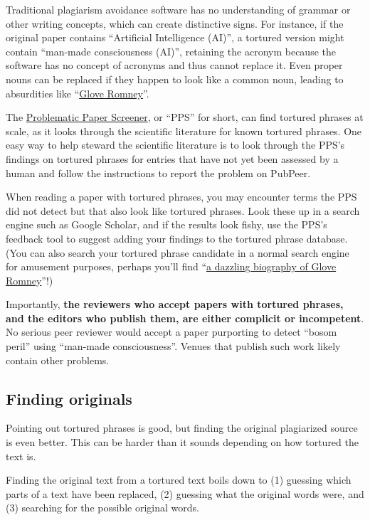 \documentclass[letterpaper, 12pt]{article}
\begin{document}
Traditional plagiarism avoidance software has no understanding of grammar or other writing concepts,
which can create distinctive signs.
For instance, if the original paper contains ``Artificial Intelligence (AI)'',
a tortured version might contain ``man-made consciousness (AI)'',
retaining the acronym because the software has no concept of acronyms and thus cannot replace it.
Even proper nouns can be replaced if they happen to look like a common noun,
leading to absurdities like ``\href{https://pubpeer.com/publications/059D502827972226591FC5F5421221}{Glove Romney}''.

The \href{https://www.irit.fr/~Guillaume.Cabanac/problematic-paper-screener}{Problematic Paper Screener},
or ``PPS'' for short, can find tortured phrases at scale, as it looks through the scientific literature for known tortured phrases.
One easy way to help steward the scientific literature is to look through the PPS's findings on tortured phrases for entries that have not yet been assessed by a human and follow the instructions to report the problem on PubPeer.

When reading a paper with tortured phrases, you may encounter terms the PPS did not detect but that also look like tortured phrases.
Look these up in a search engine such as Google Scholar, and if the results look fishy, use the PPS's feedback tool to suggest adding your findings to the tortured phrase database.
(You can also search your tortured phrase candidate in a normal search engine for amusement purposes, perhaps you'll find ``\href{https://web.archive.org/web/20250322132615/https://www.amazon.com/Mitt-Romney-Biography-Book-Flexibility-ebook/dp/B0CLKZKKQG}{a dazzling biography of Glove Romney}''!)

Importantly, \textbf{the reviewers who accept papers with tortured phrases, and the editors who publish them, are either complicit or incompetent}.
No serious peer reviewer would accept a paper purporting to detect ``bosom peril'' using ``man-made consciousness''.
Venues that publish such work likely contain other problems.

\subsection*{Finding originals}

Pointing out tortured phrases is good, but finding the original plagiarized source is even better.
This can be harder than it sounds depending on how tortured the text is.

Finding the original text from a tortured text boils down to (1) guessing which parts of a text have been replaced, (2) guessing what the original words were, and (3) searching for the possible original words.
\end{document}
